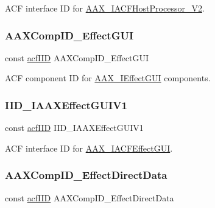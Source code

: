 A\+CF interface ID for \mbox{\hyperlink{a01697}{A\+A\+X\+\_\+\+I\+A\+C\+F\+Host\+Processor\+\_\+\+V2}}. 

\mbox{\label{a00683_aefb6e005966bfdb62469adea5fc55237}} 
\subsubsection{\texorpdfstring{AAXCompID\_EffectGUI}{AAXCompID\_EffectGUI}}
{\footnotesize\ttfamily const \mbox{\hyperlink{a00269_a59df0b41744eee7a066787aaedf97f67}{acf\+I\+ID}} A\+A\+X\+Comp\+I\+D\+\_\+\+Effect\+G\+UI}



A\+CF component ID for \mbox{\hyperlink{a01821}{A\+A\+X\+\_\+\+I\+Effect\+G\+UI}} components. 

\mbox{\label{a00683_a525360a79307aa2771a000431e2179f4}} 
\subsubsection{\texorpdfstring{IID\_IAAXEffectGUIV1}{IID\_IAAXEffectGUIV1}}
{\footnotesize\ttfamily const \mbox{\hyperlink{a00269_a59df0b41744eee7a066787aaedf97f67}{acf\+I\+ID}} I\+I\+D\+\_\+\+I\+A\+A\+X\+Effect\+G\+U\+I\+V1}



A\+CF interface ID for \mbox{\hyperlink{a01665}{A\+A\+X\+\_\+\+I\+A\+C\+F\+Effect\+G\+UI}}. 

\mbox{\label{a00683_a738ef512d18e611e103c797e2d3cfd3a}} 
\subsubsection{\texorpdfstring{AAXCompID\_EffectDirectData}{AAXCompID\_EffectDirectData}}
{\footnotesize\ttfamily const \mbox{\hyperlink{a00269_a59df0b41744eee7a066787aaedf97f67}{acf\+I\+ID}} A\+A\+X\+Comp\+I\+D\+\_\+\+Effect\+Direct\+Data}



